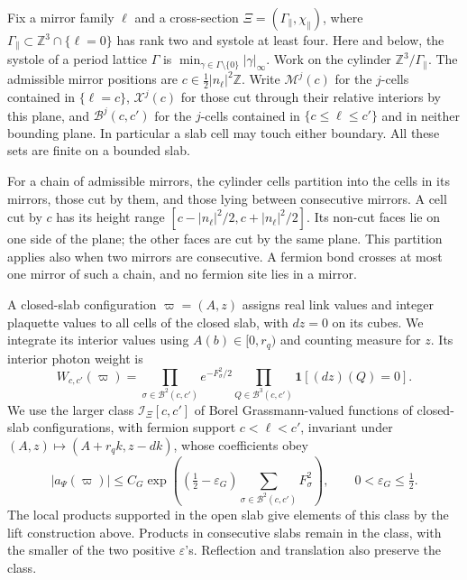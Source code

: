 \documentclass[11pt,letterpaper,reqno]{amsart}
\newcommand{\Z}{\mathbb Z}
\begin{document}
Fix a mirror family $\ell$ and a cross-section
$\Xi=(\Gamma_\parallel,\chi_\parallel)$, where
$\Gamma_\parallel\subset\Z^3\cap\{\ell=0\}$ has rank two and systole
at least four. Here and below, the systole of a period lattice
$\Gamma$ is $\min_{\gamma\in\Gamma\setminus\{0\}}|\gamma|_\infty$.
Work on the cylinder $\Z^3/\Gamma_\parallel$. The
admissible mirror positions are
$c\in\frac12|n_\ell|^2\Z$. Write $\mathcal M^j(c)$ for the $j$-cells
contained in $\{\ell=c\}$, $\mathcal X^j(c)$ for those cut through
their relative interiors by this plane, and $\mathcal B^j(c,c')$ for
the $j$-cells contained in $\{c\le\ell\le c'\}$ and in neither
bounding plane. In particular a slab cell may touch either boundary.
All these sets are finite on a bounded slab.

For a chain of admissible mirrors, the cylinder cells partition into
the cells in its mirrors, those cut by them, and those lying between
consecutive mirrors. A cell cut by $c$ has its height range
$[c-|n_\ell|^2/2,c+|n_\ell|^2/2]$. Its non-cut faces lie on one
side of the plane; the other faces are cut by the same plane. This
partition applies also when two mirrors are consecutive. A fermion
bond crosses at most one mirror of such a chain, and no fermion site
lies in a mirror.

A closed-slab configuration $\varpi=(A,z)$ assigns real link values
and integer plaquette values to all cells of the closed slab, with
$dz=0$ on its cubes. We integrate its interior values using
$A(b)\in[0,r_q)$ and counting measure for $z$. Its interior photon
weight is
\begin{equation}\label{eq:slab-interior-weight}
 W_{c,c'}(\varpi)=
    \prod_{\sigma\in\mathcal B^2(c,c')}e^{-F_\sigma^2/2}
    \prod_{Q\in\mathcal B^3(c,c')}\mathbf1[(dz)(Q)=0].
\end{equation}
We use the larger class $\mathcal I_\Xi[c,c']$ of Borel
Grassmann-valued functions of closed-slab configurations, with fermion
support $c<\ell<c'$, invariant under
$(A,z)\mapsto(A+r_qk,z-dk)$, whose coefficients obey
\begin{equation}\label{eq:slab-integrand-growth}
 |a_\Psi(\varpi)|\le C_G
   \exp\left((\tfrac12-\varepsilon_G)
          \sum_{\sigma\in\mathcal B^2(c,c')}F_\sigma^2\right),
 \qquad 0<\varepsilon_G\le\tfrac12.
\end{equation}
The local products supported in the open slab give elements of this
class by the lift construction above. Products in consecutive slabs
remain in the class, with the smaller of the two positive
$\varepsilon$'s. Reflection and translation also preserve the class.
\end{document}
